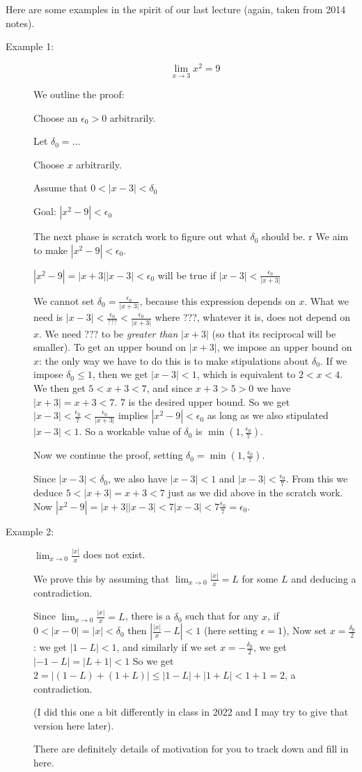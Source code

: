 \documentclass[12pt]{article}
\begin{document}
Here are some examples in the spirit of our last lecture (again, taken from 2014 notes).

\begin{description}

\item[Example 1:]  $$\lim_{x\rightarrow 3} x^2=9$$

We outline the proof:

Choose an $\epsilon_0>0$ arbitrarily.

Let $\delta_0 = \ldots$

Choose $x$ arbitrarily.

Assume that $0<|x-3|<\delta_0$

Goal:  $|x^2-9|<\epsilon_0$

The next phase is scratch work to figure out what $\delta_0$ should be.
r
We aim to make $|x^2-9|<\epsilon_0$.

$|x^2-9| = |x+3||x-3| < \epsilon_0$ will be true if $|x-3|<\frac{\epsilon_0}{|x+3|}$

We  cannot set $\delta_0=\frac{\epsilon_0}{|x+3|}$, because this expression depends on $x$.  What we need is
$|x-3|< \frac{\epsilon_0}{???}< \frac{\epsilon_0}{|x+3|}$ where ???, whatever it is, does not depend on $x$.
We need ??? to be {\em greater than\/} $|x+3|$ (so that its reciprocal will be smaller).  To get an upper bound on $|x+3|$,
we impose an upper bound on $x$:  the only way we have to do this is to make stipulations about $\delta_0$.
If we impose $\delta_0 \leq 1$, then we get $|x-3|<1$, which is equivalent to $2<x<4$.  We then get $5 <x+3<7$,
and since $x+3>5>0$ we have $|x+3|=x+3<7$.  7 is the desired upper bound.  So we get $|x-3|< \frac{\epsilon_0}{7}< \frac{\epsilon_0}{|x+3|}$ implies $|x^2-9|<\epsilon_0$ as long as we also stipulated $|x-3|<1$.  So a workable value
of $\delta_0$ is $\min(1,\frac{\epsilon_0}7)$.

Now we continue the proof, setting $\delta_0 = \min(1,\frac{\epsilon_0}7)$.  

Since $|x-3|<\delta_0$, we also have $|x-3|<1$ and $|x-3|<\frac{\epsilon_0}7$.  From this we deduce $5<|x+3|=x+3<7$ just as we did above in the scratch work.  Now $|x^2-9|=|x+3||x-3|<7|x-3|<7\frac{\epsilon_0}7=\epsilon_0$.

\item[Example 2:]  $\lim_{x \rightarrow 0}\frac{|x|}x$  does not exist.

We prove this by assuming that $\lim_{x \rightarrow 0}\frac{|x|}x=L$  for some $L$ and deducing a contradiction.

Since  $\lim_{x \rightarrow 0}\frac{|x|}x=L$, there is a $\delta_0$ such that for any $x$, if $0<|x-0|=|x|<\delta_0$
then $|\frac{|x|}x-L|<1$  (here setting $\epsilon=1$),  Now set $x=\frac{\delta_0}2$:  we get $|1-L|<1$,
and similarly if we set $x=-\frac{\delta_0}2$, we get $|-1-L|=|L+1|< 1$  So we get $2=|(1-L)+(1+L)| \leq |1-L|+|1+L|<1+1=2$, a contradiction.

(I did this one a bit differently in class in 2022 and I may try to give that version here later).

There are definitely details of motivation for you to track down and fill in here.

\end{description}
\end{document}
